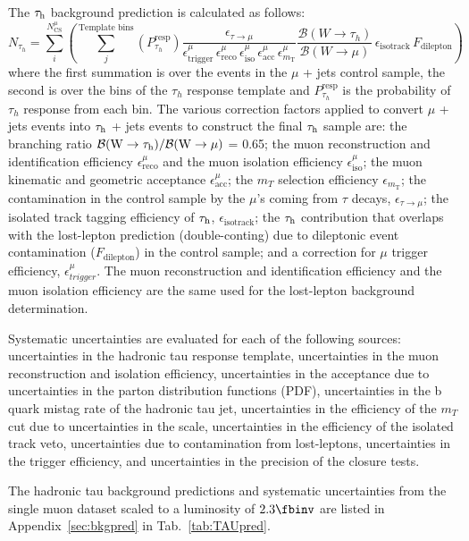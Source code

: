 The $\tau_\mathrm{h}$ background prediction is calculated as follows:
\begin{equation}
N_{\tau_{h}} = \sum\limits_i^{N_\mathrm{CS}^\mu}\left(\sum\limits_j^\text{Template bins}(P_{\tau_h}^\text{resp})
\frac{\epsilon_{\tau \rightarrow \mu}}{\epsilon^{\mu}_\text{trigger}\,\epsilon^{\mu}_\text{reco}\,\epsilon^{\mu}_\text{iso}\,\epsilon^{\mu}_\text{acc}\,\epsilon^{\mu}_{m_\text{T}}}
\dfrac{ \mathcal{B}(W \rightarrow \tau_h)}{\mathcal{B}(W \rightarrow \mu)}
\,\epsilon_\text{isotrack}
\,F_\text{dilepton}\right)
\label{eqn:tauh}
\end{equation}
where the first summation is over the events in the $\mu$ + jets control sample, the second is over the bins of the $\tau_h$ response template and $P_{\tau_h}^\text{resp}$ is the probability of $\tau_h$ response from each bin. 
%
The various correction factors applied to convert $\mu$ + jets events into $\tau_\mathrm{h}$ + jets events to construct the final $\tau_\mathrm{h}$ sample are: the branching ratio $\mathcal{B}(\mathrm{W} \rightarrow \tau_\mathrm{h})/\mathcal{B}(\mathrm{W} \rightarrow \mu)$ = 0.65; the muon reconstruction and identification efficiency $\epsilon^{\mu}_\text{reco}$ and the muon isolation efficiency $\epsilon^{\mu}_\text{iso}$; the muon kinematic and geometric acceptance $\epsilon^{\mu}_\text{acc}$; the $m_{T}$ selection efficiency $\epsilon_{m_\text{T}}$; the contamination in the control sample by the $\mu$'s coming from $\tau$ decays, $\epsilon_{\tau \rightarrow \mu}$; the isolated track tagging efficiency of $\tau_\mathrm{h}$, $\epsilon_\text{isotrack}$; the $\tau_\mathrm{h}$ contribution that overlaps with the lost-lepton prediction (double-conting) due to dileptonic event contamination ($F_\text{dilepton}$) in the control sample; and a correction for $\mu$ trigger efficiency, $\epsilon^{\mu}_{trigger}$. 
%
The muon reconstruction and identification efficiency and the muon isolation efficiency are the same used for the lost-lepton background determination. 
%

Systematic uncertainties are evaluated for each of the following sources: uncertainties in the hadronic tau response template, uncertainties in the muon reconstruction and isolation efficiency, uncertainties in the acceptance due to  uncertainties in the parton distribution functions (PDF), uncertainties in the b quark mistag rate of the hadronic tau jet, uncertainties in the efficiency of the $m_{T}$ cut due to uncertainties in the \met scale, uncertainties in the efficiency of the isolated track veto, uncertainties due to contamination from lost-leptons, uncertainties in the trigger efficiency, and uncertainties in the precision of the closure tests.

The hadronic tau background predictions and systematic uncertainties from the single muon dataset scaled to a luminosity of $2.3\fbinv$ are listed in Appendix~\ref{sec:bkgpred} in Tab.~\ref{tab:TAUpred}.  
